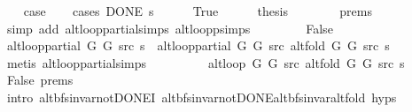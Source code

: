 \begin{isabellebody}
\ \ \isamarkupfalse%
\ {\isacharquery}{\kern0pt}case\isanewline
\ \ \isamarkupfalse%
\ {\isacharparenleft}{\kern0pt}cases\ {\isachardoublequoteopen}DONE\ s{\isachardoublequoteclose}{\isacharparenright}{\kern0pt}\isanewline
\ \ \ \ \isamarkupfalse%
\ True\isanewline
\ \ \ \ \isamarkupfalse%
\ {\isacharquery}{\kern0pt}thesis\isanewline
\ \ \ \ \ \ \isamarkupfalse%
\ {\isachardoublequoteopen}{}{\isachardot}{\kern0pt}prems{\isachardoublequoteclose}\isanewline
\ \ \ \ \ \ \isamarkupfalse%
\ {\isacharparenleft}{\kern0pt}simp\ add{\isacharcolon}{\kern0pt}\ alt{\isacharunderscore}{\kern0pt}loop{\isacharunderscore}{\kern0pt}partial{\isachardot}{\kern0pt}simps\ alt{\isacharunderscore}{\kern0pt}loop{\isacharunderscore}{\kern0pt}psimps{\isacharparenright}{\kern0pt}\isanewline
\ \ \isamarkupfalse%
\isanewline
\ \ \ \ \isamarkupfalse%
\ False\isanewline
\ \ \ \ \isamarkupfalse%
\ {\isachardoublequoteopen}alt{\isacharunderscore}{\kern0pt}loop{\isacharunderscore}{\kern0pt}partial\ G{}\ G{}\ src\ s\ {\isacharequal}{\kern0pt}\ alt{\isacharunderscore}{\kern0pt}loop{\isacharunderscore}{\kern0pt}partial\ G{}\ G{}\ src\ {\isacharparenleft}{\kern0pt}alt{\isacharunderscore}{\kern0pt}fold\ G{}\ G{}\ src\ s{\isacharparenright}{\kern0pt}{\isachardoublequoteclose}\isanewline
\ \ \ \ \ \ \isamarkupfalse%
\ {\isacharparenleft}{\kern0pt}metis\ alt{\isacharunderscore}{\kern0pt}loop{\isacharunderscore}{\kern0pt}partial{\isachardot}{\kern0pt}simps{\isacharparenright}{\kern0pt}\isanewline
\ \ \ \ \isamarkupfalse%
\ \isamarkupfalse%
\ {\isachardoublequoteopen}{\isachardot}{\kern0pt}{\isachardot}{\kern0pt}{\isachardot}{\kern0pt}\ {\isacharequal}{\kern0pt}\ alt{\isacharunderscore}{\kern0pt}loop\ G{}\ G{}\ src\ {\isacharparenleft}{\kern0pt}alt{\isacharunderscore}{\kern0pt}fold\ G{}\ G{}\ src\ s{\isacharparenright}{\kern0pt}{\isachardoublequoteclose}\isanewline
\ \ \ \ \ \ \isamarkupfalse%
\ False\ {\isachardoublequoteopen}{}{\isachardot}{\kern0pt}prems{\isachardoublequoteclose}\isanewline
\ \ \ \ \ \ \isamarkupfalse%
\ {\isacharparenleft}{\kern0pt}intro\ alt{\isacharunderscore}{\kern0pt}bfs{\isacharunderscore}{\kern0pt}invar{\isacharunderscore}{\kern0pt}not{\isacharunderscore}{\kern0pt}DONE{\isacharprime}{\kern0pt}I\ alt{\isacharunderscore}{\kern0pt}bfs{\isacharunderscore}{\kern0pt}invar{\isacharunderscore}{\kern0pt}not{\isacharunderscore}{\kern0pt}DONE{\isachardot}{\kern0pt}alt{\isacharunderscore}{\kern0pt}bfs{\isacharunderscore}{\kern0pt}invar{\isacharunderscore}{\kern0pt}alt{\isacharunderscore}{\kern0pt}fold\ {\isachardoublequoteopen}{}{\isachardot}{\kern0pt}hyps{\isachardoublequoteclose}{\isacharparenright}{\kern0pt}\isanewline

\end{isabellebody}
